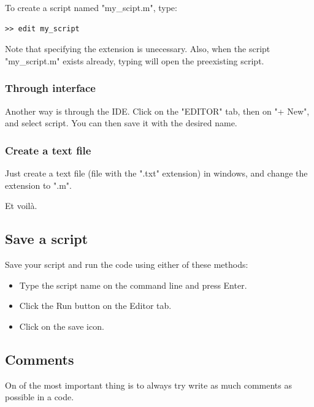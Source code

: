 			To create a script named "my\_scipt.m", type:
\begin{lstlisting}
>> edit my_script
\end{lstlisting}
			Note that specifying the extension is unecessary.
			Also, when the script "my\_script.m" exists already, typing  will open the preexisting script.		
		\subsubsection{Through \matlab interface}
			Another way is through the IDE.
			Click on the "EDITOR" tab, then on "+ New", and select script.
			You can then save it with the desired name.

		\subsubsection{Create a text file}
			Just create a text file (file with the ".txt" extension) in windows, and change the extension to ".m".

		Et voilà.

	\subsection{Save a script}
		Save your script and run the code using either of these methods:
		\begin{itemize}
			\item Type the script name on the command line and press Enter. 
			\item Click the Run button on the Editor tab.
			\item Click on the save icon.
		\end{itemize}

	\subsection{Comments}
		On of the most important thing is to always try write as much comments as possible in a code.



